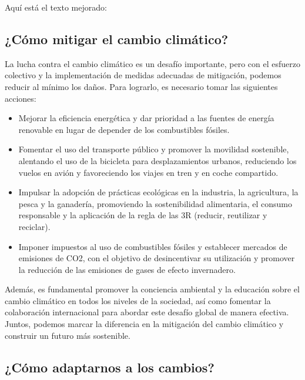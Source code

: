 \documentclass[
  letterpaper,
  DIV=11,
  numbers=noendperiod]{scrartcl}
\begin{document}
Aquí está el texto mejorado:

\hypertarget{cuxf3mo-mitigar-el-cambio-climuxe1tico}{%
\subsection{¿Cómo mitigar el cambio
climático?}\label{cuxf3mo-mitigar-el-cambio-climuxe1tico}}

La lucha contra el cambio climático es un desafío importante, pero con
el esfuerzo colectivo y la implementación de medidas adecuadas de
mitigación, podemos reducir al mínimo los daños. Para lograrlo, es
necesario tomar las siguientes acciones:

\begin{itemize}
\item
  Mejorar la eficiencia energética y dar prioridad a las fuentes de
  energía renovable en lugar de depender de los combustibles fósiles.
\item
  Fomentar el uso del transporte público y promover la movilidad
  sostenible, alentando el uso de la bicicleta para desplazamientos
  urbanos, reduciendo los vuelos en avión y favoreciendo los viajes en
  tren y en coche compartido.
\item
  Impulsar la adopción de prácticas ecológicas en la industria, la
  agricultura, la pesca y la ganadería, promoviendo la sostenibilidad
  alimentaria, el consumo responsable y la aplicación de la regla de las
  3R (reducir, reutilizar y reciclar).
\item
  Imponer impuestos al uso de combustibles fósiles y establecer mercados
  de emisiones de CO2, con el objetivo de desincentivar su utilización y
  promover la reducción de las emisiones de gases de efecto invernadero.
\end{itemize}

Además, es fundamental promover la conciencia ambiental y la educación
sobre el cambio climático en todos los niveles de la sociedad, así como
fomentar la colaboración internacional para abordar este desafío global
de manera efectiva. Juntos, podemos marcar la diferencia en la
mitigación del cambio climático y construir un futuro más sostenible.

\hypertarget{cuxf3mo-adaptarnos-a-los-cambios}{%
\subsection{¿Cómo adaptarnos a los
cambios?}\label{cuxf3mo-adaptarnos-a-los-cambios}}
\end{document}
